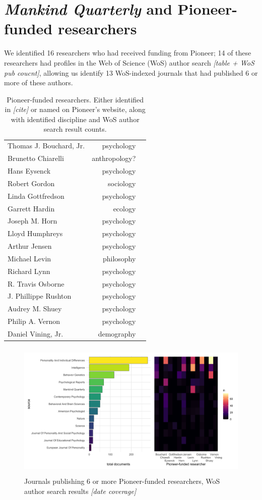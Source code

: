 \documentclass[12pt]{article}
\begin{document}
\hypertarget{mankind-quarterly-and-pioneer-funded-researchers}{%
\section*{\texorpdfstring{\emph{Mankind Quarterly} and Pioneer-funded
researchers}{Mankind Quarterly and Pioneer-funded researchers}}\label{mankind-quarterly-and-pioneer-funded-researchers}}

We identified 16 researchers who had received funding from Pioneer; 14
of these researchers had profiles in the Web of Science (WoS) author
search \emph{{[}table + WoS pub coucnt{]}}, allowing us identify 13
WoS-indexed journals that had published 6 or more of these authors.

\begin{longtable}[]{@{}lrl@{}}
\caption{Pioneer-funded researchers. Either identified in
\emph{{[}cite{]}} or named on Pioneer's website, along with identified
discipline and WoS author search result counts.}\tabularnewline
\toprule
\endhead
Thomas J. Bouchard, Jr. & psychology & \\
Brunetto Chiarelli & anthropology? & \\
Hans Eysenck & psychology & \\
Robert Gordon & sociology & \\
Linda Gottfredson & psychology & \\
Garrett Hardin & ecology & \\
Joseph M. Horn & psychology & \\
Lloyd Humphreys & psychology & \\
Arthur Jensen & psychology & \\
Michael Levin & philosophy & \\
Richard Lynn & psychology & \\
R. Travis Osborne & psychology & \\
J. Phillippe Rushton & psychology & \\
Audrey M. Shuey & psychology & \\
Philip A. Vernon & psychology & \\
Daniel Vining, Jr. & demography & \\
\bottomrule
\end{longtable}

\begin{figure}
\centering
\includegraphics[width=4.76in,height=2.6in]{img/wos_results.png}
\caption{Journals publishing 6 or more Pioneer-funded researchers, WoS
author search results \emph{{[}date coverage{]}}}
\end{figure}
\end{document}
